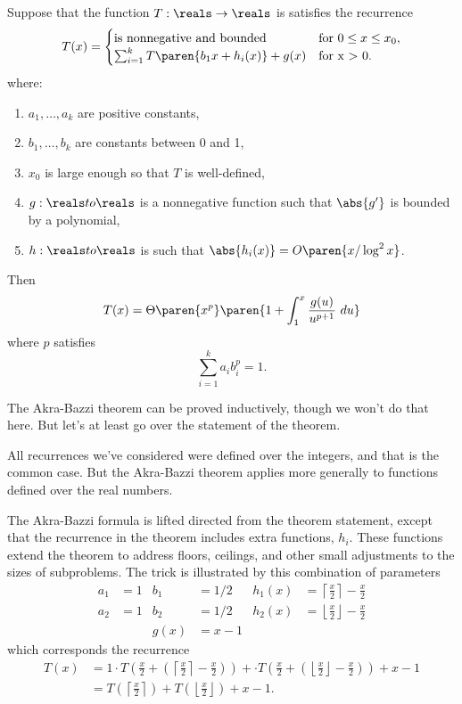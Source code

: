 \begin{theorem}
\label{th:akra-bazzi}
Suppose that the function $T: \reals \to \reals$ is satisfies
the recurrence
\[
T(x) =
\begin{cases}
\text{is nonnegative and bounded} & \text{for $0 \leq x \leq x_0$}, \\
\sum_{i=1}^k T\paren{b_1x + h_i(x)} + g(x) & \text{for x > 0}.
\end{cases}
\]
where:
\begin{enumerate}
\item $a_1, \dots, a_k$ are positive constants,
\item $b_1, \dots, b_k$ are constants between 0 and 1,
\item $x_0$ is large enough so that $T$ is well-defined,
\item $g:\reals to \reals$ is a nonnegative function such that $\abs{g'}$ is
  bounded by a polynomial,
\item $h:\reals to \reals$ is such that $\abs{h_i(x)} = O\paren{x / \log^2 x}$.
\end{enumerate}
Then
\[
T(x) = \Theta\paren{x^p }\paren{1 + \int_1^x \frac{g(u)}{u^{p+1}} \ du}
\]
where $p$ satisfies
\begin{equation*}
\sum_{i=1}^k {a_i b_i^p} = 1.
\end{equation*}
\end{theorem}

The Akra-Bazzi theorem can be proved inductively, though we won't do
that here.  But let's at least go over the statement of the theorem.

All recurrences we've considered were defined over the integers, and
that is the common case.  But the Akra-Bazzi theorem applies more
generally to functions defined over the real numbers.

The Akra-Bazzi formula is lifted directed from the theorem statement,
except that the recurrence in the theorem includes extra functions,
$h_i$.  These functions extend the theorem to address floors,
ceilings, and other small adjustments to the sizes of subproblems.
The trick is illustrated by this combination of parameters
\begin{align*}
a_1 &= 1 & b_1 & = 1/2 & h_1(x) & = \left\lceil\frac{x}{2}\right\rceil -
\frac{x}{2}\\
a_2 &= 1 & b_2 & = 1/2 & h_2(x) & = \left\lfloor\frac{x}{2}\right\rfloor -
\frac{x}{2} \\
& & g(x) & = x - 1
\end{align*}
which corresponds the recurrence
\begin{align*}
T(x) & = 1 \cdot T\left(\frac{x}{2} + \left(\left\lceil\frac{x}{2}\right\rceil -\frac{x}{2}\right)\right) + 
 \cdot T\left(\frac{x}{2} +
\left(\left\lfloor\frac{x}{2}\right\rfloor -
  \frac{x}{2}\right)\right) + x - 1 \\
 & = T\left(\left\lceil\frac{x}{2}\right\rceil\right) +
 T\left(\left\lfloor\frac{x}{2}\right\rfloor\right) + x - 1.
\end{align*}

